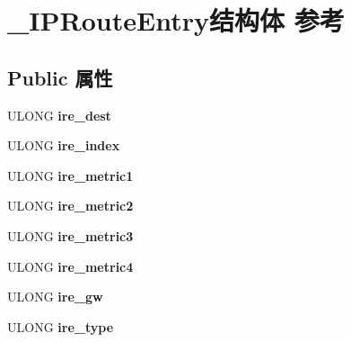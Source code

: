 \hypertarget{struct___i_p_route_entry}{}\section{\+\_\+\+I\+P\+Route\+Entry结构体 参考}
\label{struct___i_p_route_entry}
\subsection*{Public 属性}
\begin{DoxyCompactItemize}
\item 
\mbox{\label{struct___i_p_route_entry_a7532401552862d1a4ecf5c320ee1bf81}} 
U\+L\+O\+NG {\bfseries ire\+\_\+dest}
\item 
\mbox{\label{struct___i_p_route_entry_ab8a60c8672baf1252214093da7e6ce7b}} 
U\+L\+O\+NG {\bfseries ire\+\_\+index}
\item 
\mbox{\label{struct___i_p_route_entry_a509b0c50c60a71da32d91602cc5141ea}} 
U\+L\+O\+NG {\bfseries ire\+\_\+metric1}
\item 
\mbox{\label{struct___i_p_route_entry_a28422584bfbe5e09252e75f648d0147b}} 
U\+L\+O\+NG {\bfseries ire\+\_\+metric2}
\item 
\mbox{\label{struct___i_p_route_entry_a73bc68b3252b4c8b7d8f1d14ecd8e17a}} 
U\+L\+O\+NG {\bfseries ire\+\_\+metric3}
\item 
\mbox{\label{struct___i_p_route_entry_a889fba81b2e723ec77edbdb4e30120b8}} 
U\+L\+O\+NG {\bfseries ire\+\_\+metric4}
\item 
\mbox{\label{struct___i_p_route_entry_a61fd3b9e7d5ffa37d09f2299eb1b7cb1}} 
U\+L\+O\+NG {\bfseries ire\+\_\+gw}
\item 
\mbox{\label{struct___i_p_route_entry_a0882e53134170e428acc0fc5a145651e}} 
U\+L\+O\+NG {\bfseries ire\+\_\+type}
\item 
\mbox{\label{struct___i_p_route_entry_a2cc3782dab86bc9d233ba19e346f1ae8}} 

\end{DoxyCompactItemize}
